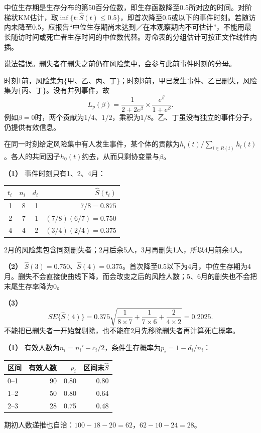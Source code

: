 
中位生存期是生存分布的第50百分位数，即生存函数降至0.5所对应的时间。对阶梯状KM估计，取\(\inf\{t:\hat S(t)\le0.5\}\)，即首次降至0.5或以下的事件时刻。若随访内未降至0.5，应报告“中位生存期尚未达到／在本观察期内不可估计”，不能用最长随访时间或死亡者生存时间的中位数代替。寿命表的分组估计可按正文作线性内插。




说法错误。删失者在删失之前仍在风险集中，会参与此前事件时刻的分母。

时刻1前，风险集为\(\{\text{甲、乙、丙、丁}\}\)；时刻3前，甲已发生事件、乙已删失，风险集为\(\{\text{丙、丁}\}\)。没有并列事件，故
\[L_p(\beta)=\frac{1}{2+2e^\beta}\times\frac{e^\beta}{1+e^\beta}.\]
例如\(\beta=0\)时，两个贡献为\(1/4\)、\(1/2\)，乘积为\(1/8\)。乙、丁虽没有独立的事件分子，仍提供有效信息。

在同一时刻给定风险集中有人发生事件，某个体的贡献为\(h_i(t)/\sum_{l\in R(t)}h_l(t)\)。各人的共同因子\(h_0(t)\)约去，从而只剩协变量与\(\beta\)。




\textbf{（1）} 事件时刻只有1、2、4月：
\begin{center}\begin{tabular}{rrrr}\toprule
\(t_i\) & \(n_i\) & \(d_i\) & \(\hat S(t_i)\)\\\midrule
1 & 8 & 1 & \(7/8=0.875\)\\
2 & 7 & 1 & \((7/8)(6/7)=0.750\)\\
4 & 4 & 2 & \((3/4)(2/4)=0.375\)\\\bottomrule
\end{tabular}\end{center}
2月的风险集包含同刻删失者；2月后余5人，3月再删失1人，所以4月前余4人。

\textbf{（2）} \(\hat S(3)=0.750\)、\(\hat S(4)=0.375\)。首次降至0.5以下为4月，中位生存期为4月。删失不会直接使曲线下降，而会改变之后的风险人数；5、6月的删失也不会把末尾生存率降为0。

\textbf{（3）}
\[SE\{\hat S(4)\}=0.375\sqrt{\frac1{8\times7}+\frac1{7\times6}
+\frac2{4\times2}}=0.2025.\]
不能把已删失者一开始就剔除，也不能在2月先移除删失者再计算死亡概率。




\textbf{（1）} 有效人数为\(n_i=n_i'-c_i/2\)，条件生存概率为\(p_i=1-d_i/n_i\)：
\begin{center}\begin{tabular}{lrrr}\toprule
区间 & 有效人数 & \(p_i\) & 区间末\(\hat S\)\\\midrule
0--1 & 90 & 0.80 & 0.80\\
1--2 & 50 & 0.80 & 0.64\\
2--3 & 28 & 0.75 & 0.48\\\bottomrule
\end{tabular}\end{center}
期初人数递推也自洽：\(100-18-20=62\)，\(62-10-24=28\)。

